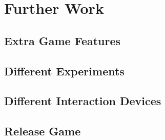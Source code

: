\chapter{Further Work}
\label{chp:further_work}
\section{Extra Game Features}
\section{Different Experiments}
\section{Different Interaction Devices}
\section{Release Game}
